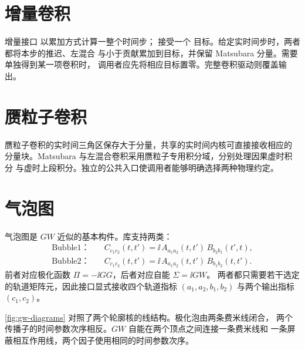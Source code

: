 \section{增量卷积}
\label{sec:incr}

增量接口  以累加方式计算一整个时间步；
 接受一个
 目标。给定实时间步时，两者都将本步的推迟、左混合
与小于贡献累加到目标，并保留 Matsubara 分量。需要单独得到某一项卷积时，
调用者应先将相应目标置零。完整卷积驱动则覆盖输出。

\section{赝粒子卷积}
\label{sec:pseudo-kernel}

赝粒子卷积的实时间三角区保存大于分量，共享的实时间内核可直接接收相应的
分量块。Matsubara 与左混合卷积采用赝粒子专用积分域，分别处理因果虚时积分
与虚时上段积分。独立的公共入口使调用者能够明确选择两种物理约定。

\section{气泡图}
\label{sec:bubble}

气泡图是 $GW$ 近似的基本构件。库支持两类：
\begin{align}
    \text{Bubble1：} & \quad C_{c_1c_2}(t,t') =
        \ii\,A_{a_1a_2}(t,t')\,B_{b_2b_1}(t',t),\\
    \text{Bubble2：} & \quad C_{c_1c_2}(t,t') =
        \ii\,A_{a_1a_2}(t,t')\,B_{b_1b_2}(t,t').
\end{align}
前者对应极化函数 $\Pi=-\ii GG$，后者对应自能 $\Sigma=\ii GW$。
两者都只需要若干选定的轨道矩阵元，因此接口显式接收四个轨道指标
$(a_1,a_2,b_1,b_2)$ 与两个输出指标 $(c_1,c_2)$。

\cref{fig:gw-diagrams} 对照了两个轮廓核的线结构。极化泡由两条费米线闭合，
两个传播子的时间参数次序相反。$GW$ 自能在两个顶点之间连接一条费米线和
一条屏蔽相互作用线，两个因子使用相同的时间参数次序。

